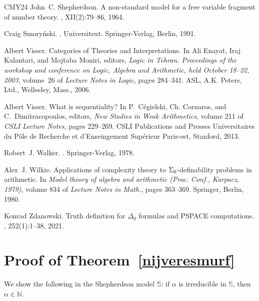 \documentclass{amsart}
\begin{document}
\begin{thebibliography}{CMY24}
John~C. Shepherdson.
\newblock A non-standard model for a free variable fragment of number theory.
, XII(2):79--86,
  1964.

Craig Smory\'{n}ski.
.
\newblock Universitext. Springer-Verlag, Berlin, 1991.

Albert Visser.
\newblock Categories of {T}heories and {I}nterpretations.
\newblock In Ali Enayat, Iraj Kalantari, and Mojtaba Moniri, editors, {\em
  {Logic in {T}ehran. {P}roceedings of the workshop and conference on {L}ogic,
  {A}lgebra and {A}rithmetic, held {O}ctober 18--22, 2003}}, volume~26 of {\em
  Lecture {N}otes in {L}ogic}, pages 284--341. ASL, A.K. Peters, Ltd.,
  Wellesley, Mass., 2006.

Albert Visser.
\newblock What is sequentiality?
\newblock In P.~C{\'{e}}gielski, Ch. Cornaros, and C.~Dimitracopoulos, editors,
  {\em New Studies in Weak Arithmetics}, volume 211 of {\em CSLI Lecture
  Notes}, pages 229--269. CSLI Publications and Presses Universitaires du
  P{\^{o}}le de Recherche et d'Enseingement Sup{\'{e}}rieur Paris-est,
  Stanford, 2013.

Robert~J. Walker.
.
\newblock Springer-Verlag, 1978.

Alex~J. Wilkie.
\newblock Applications of complexity theory to {$\Sigma \sb{0}$}-definability
  problems in arithmetic.
\newblock In {\em Model theory of algebra and arithmetic ({P}roc. {C}onf.,
  {K}arpacz, 1979)}, volume 834 of {\em Lecture Notes in Math.}, pages
  363--369. Springer, Berlin, 1980.

Konrad Zdanowski.
\newblock Truth definition for {$\Delta_0$} formulas and {PSPACE} computations.
, 252(1):1--38, 2021.

\end{thebibliography}


\appendix

\section{Proof of Theorem~\ref{nijveresmurf}}\label{robuustesmurf}

We show the following in the Shepherdson model $\mathbb S$:
    if $\alpha$ is irreducible in $\mathbb{S}$, then $\alpha\in \mathbb{N}$.
\end{document}
